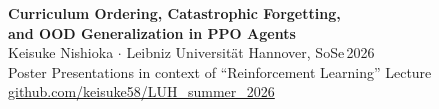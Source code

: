 \documentclass[20pt]{article}
\renewcommand{\large}{\fontsize{34}{42}\selectfont}
\renewcommand{\LARGE}{\fontsize{48}{58}\selectfont}
\renewcommand{\huge}{\fontsize{62}{74}\selectfont}
\begin{document}
\noindent\colorbox{tmplblue}{\parbox{\linewidth}{\vspace{4mm}}}\par\vspace{8pt}

\noindent\hspace{2mm}\parbox{\dimexpr\linewidth-4mm}{%
  {\huge\bfseries
    Curriculum Ordering, Catastrophic Forgetting,\\[10pt]
    and OOD Generalization in PPO Agents}\\[12pt]
  {\LARGE Keisuke Nishioka \enspace$\cdot$\enspace
    Leibniz Universit\"{a}t Hannover, SoSe\,2026}\\[8pt]
  {\large\color{gray}
    Poster Presentations in context of ``Reinforcement Learning'' Lecture
    \quad\url{github.com/keisuke58/LUH_summer_2026}}%
}\par\vspace{8pt}

\noindent\colorbox{tmplblue}{\parbox{\linewidth}{\vspace{4mm}}}\par\vspace{12pt}
\end{document}
